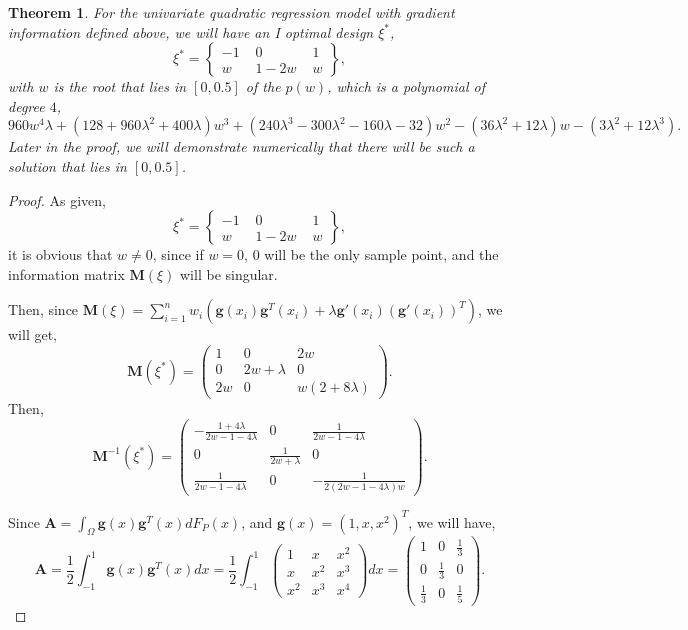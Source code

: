 \documentclass[preprint,12pt]{elsarticle}
\newtheorem{thm}{Theorem}
\begin{document}
\begin{thm}
For the univariate quadratic regression model with gradient
information defined above, we will have an I optimal design $\xi^*$,
$$\xi^*=\left\{\begin{array}{ccc}-1\,\,&0\,\,&1\\w\,\,&1-2w\,\,&w\end{array}\right\},$$
with $w$ is the root that lies in $[0,0.5]$ of the $p(w)$, which is
a polynomial of degree $4$,\small
$$960w^4\lambda+\left(128+960\lambda^2+400\lambda\right)w^3+\left(240\lambda^3-300\lambda^2-160\lambda-32\right)w^2-\left(36\lambda^2+12\lambda\right)w-\left(3\lambda^2+12\lambda^3\right).$$\normalsize
Later in the proof, we will demonstrate numerically that there will
be such a solution that lies in $[0,0.5]$.
\end{thm}
\begin{proof}
As given,
$$\xi^*=\left\{\begin{array}{ccc}-1\,\,&0\,\,&1\\w\,\,&1-2w\,\,&w\end{array}\right\},$$
it is obvious that $w\neq0$, since if $w=0$, $0$ will be the only
sample point, and the information matrix $\boldsymbol{M}(\xi)$ will
be singular.

Then, since
$\boldsymbol{M}(\xi)=\sum\limits_{i=1}^nw_i\left(\boldsymbol{g}(x_i)\boldsymbol{g}^T(x_i)+\lambda\boldsymbol{g}'(x_i)
\left(\boldsymbol{g}'(x_i)\right)^T\right)$, we will get,
$$\boldsymbol{M}(\xi^*)=\left(\begin{array}{ccc}1&0&2w\\0&2w+\lambda&0\\2w&0&w(2+8\lambda
)\end{array}\right).$$ Then,
$$\boldsymbol{M}^{-1}(\xi^*)=\left(\begin{array}{ccc}-\frac{1+4\lambda}{2w-1-4\lambda}&0&\frac{1}{2w-1-4\lambda}\\0&\frac{1}{2w+\lambda}&0\\\frac{1}{2w-1-4\lambda}&0&-\frac{1}{2(2w-1-4\lambda)w}\end{array}\right).$$

Since
$\boldsymbol{A}=\int_{\Omega}\boldsymbol{g}(x)\boldsymbol{g}^T(x)dF_P(x)$,
and $\boldsymbol{g}(x)=(1,x,x^2)^T$, we will have,
$$\boldsymbol{A}=\frac{1}{2}\int_{-1}^1\boldsymbol{g}(x)\boldsymbol{g}^T(x)dx=\frac{1}{2}\int_{-1}^1\left(\begin{array}{ccc}1&x&x^2\\x&x^2&x^3\\x^2&x^3&x^4\end{array}\right)dx=\left(\begin{array}{ccc}1&0&\frac{1}{3}\\0&\frac{1}{3}&0\\\frac{1}{3}&0&\frac{1}{5}\end{array}\right).$$


\end{proof}
\end{document}
